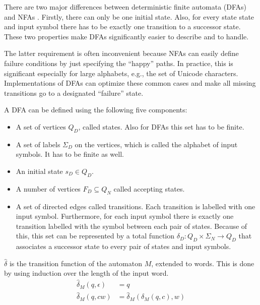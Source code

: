 There are two major differences between deterministic finite automata (DFAs) and NFAs .
Firstly, there can only be one initial state.
Also, for every state state and input symbol there
has to be exactly one transition to a successor state.
These two properties make DFAs significantly easier to describe and to handle.

The latter requirement is often inconvenient because NFAs can easily define
failure conditions by just specifying the ``happy'' paths.
In practice, this is significant especially for large alphabets, e.g.,
the set of Unicode characters.
Implementations of DFAs can optimize these common cases and
make all missing transitions go to a designated ``failure'' state.

\begin{definition}
    A DFA can be defined using the following five components:

    \begin{itemize}
        \item A set of vertices $Q_D$, called states.
            Also for DFAs this set has to be finite.
        \item A set of labels $\Sigma_D$ on the vertices,
            which is called the alphabet of input symbols.
            It has to be finite as well.
        \item An initial state $s_D \in Q_D$.
        \item A number of vertices $F_D \subseteq Q_N$ called accepting states.
        \item A set of directed edges called transitions.
            Each transition is labelled with one input symbol.
            Furthermore, for each input symbol there is
            exactly one transition labelled with the symbol between each pair of states.
            Because of this, this set can be represented by a total function
            $\delta_D : Q_D \times \Sigma_N \rightarrow Q_D$
            that associates a successor state to every pair of states and input symbols.
    \end{itemize}
\end{definition}

\begin{definition}
    $\hat\delta$ is the transition function of the automaton $M$, extended to words.
    This is done by using induction over the length of the input word.
    \begin{align}
        \hat\delta_M(q, \epsilon) &= q\\
        \hat\delta_M(q, c w) &= \hat\delta_M(\delta_M(q, c), w)
    \end{align}
\end{definition}

